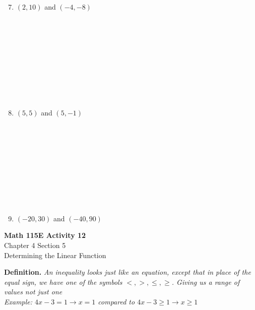 \documentclass[12pt]{article}
\begin{document}
\begin{minipage}[t]{0.4\textwidth}
    \begin{enumerate}[\#1]
        \setcounter{enumi}{6} %
        \item $(2,10)$ and $(-4,-8)$
        \\\\\\\\\\\\\\\\\\\\
        \item $(5,5)$ and $(5,-1)$
        \\\\\\\\\\\\\\\\\\\\
        \item $(-20,30)$ and $(-40,90)$
         \end{enumerate}
\hfill
\end{minipage}

\vspace{10cm}

\begin{center}
    \Large \textbf{Math 115E Activity 12} \\
    \vspace{0.2cm}
    \normalsize Chapter 4 Section 5 \\
    \normalsize Determining the Linear Function
\end{center}

\begin{tcolorbox}[
    width=\linewidth,
    colframe=black,         %
    colback=white,          %
    boxrule=0.5pt,          %
    left=1mm, right=1.1mm,    %
    top=1mm, bottom=1mm,    %
    arc=2mm                 %
]
\textbf{Definition.} 
\textit{An inequality looks just like an equation, except that in place of
the equal sign, we have one of the symbols $<,>,\leq, \geq$. Giving us a range of values not just one\\
Example: $4x-3=1 \rightarrow x=1$ compared to $4x-3\geq1 \rightarrow x\geq1$}

\end{tcolorbox}
\end{document}
